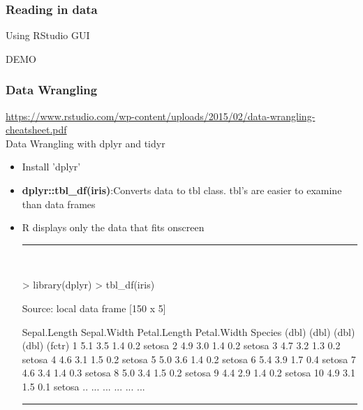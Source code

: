\documentclass{beamer}
\begin{document}
\begin{frame}[fragile]
	\frametitle{Reading in data}
	\centering \Large Using RStudio GUI
	\vspace{40pt}

	\begin{center}	\Huge DEMO \end{center}
\end{frame}
\begin{frame}[fragile]
	\frametitle{Data Wrangling}
	\centering \tiny \url{https://www.rstudio.com/wp-content/uploads/2015/02/data-wrangling-cheatsheet.pdf}\\
	\centering \Large Data Wrangling with dplyr and tidyr
	\begin{itemize}
	\small
		\item Install 'dplyr'
		\pause
	\item \textbf{dplyr::tbl\_df(iris)}:Converts data to tbl class. tbl's are easier to examine than data frames
	\item R displays only the data that fits onscreen
		\vspace{5pt}
\rule{\textwidth}{0.4pt}\\
\tiny
\setlength{\fancyvrbtopsep}{-1pt}
\setlength{\fancyvrbpartopsep}{-1pt}
\begin{Schunk}
\begin{Sinput}
> library(dplyr)
> tbl_df(iris)
\end{Sinput}
\begin{Soutput}
Source: local data frame [150 x 5]

   Sepal.Length Sepal.Width Petal.Length Petal.Width Species
          (dbl)       (dbl)        (dbl)       (dbl)  (fctr)
1           5.1         3.5          1.4         0.2  setosa
2           4.9         3.0          1.4         0.2  setosa
3           4.7         3.2          1.3         0.2  setosa
4           4.6         3.1          1.5         0.2  setosa
5           5.0         3.6          1.4         0.2  setosa
6           5.4         3.9          1.7         0.4  setosa
7           4.6         3.4          1.4         0.3  setosa
8           5.0         3.4          1.5         0.2  setosa
9           4.4         2.9          1.4         0.2  setosa
10          4.9         3.1          1.5         0.1  setosa
..          ...         ...          ...         ...     ...
\end{Soutput}
\end{Schunk}
\rule{\textwidth}{0.4pt}\\
\small

	\end{itemize}

\end{frame}
\end{document}
